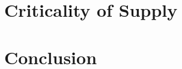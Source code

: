 \documentclass[noraggedright]{turabian-researchpaper}
\begin{document}

\section{} %


\section{Criticality of Supply}






\section{Conclusion}

\newpage

\printbibliography
\end{document}
